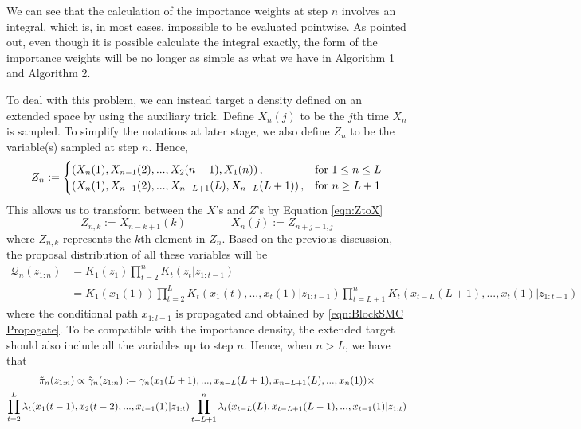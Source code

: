 \documentclass[12pt,a4paper]{article}
\begin{document}
We can see that the calculation of the importance weights at step $n$ involves an integral, which is, in most cases, impossible to be evaluated pointwise. As \cite{doucet2006efficient} pointed out, even though it is possible calculate the integral exactly, the form of the importance weights will be no longer as simple as what we have in Algorithm 1 and Algorithm 2. 

To deal with this problem, we can instead target a density defined on an extended space by using the auxiliary trick. Define $X_n(j)$ to be the $j$th time $X_n$ is sampled. To simplify the notations at later stage, we also define $Z_n$ to be the variable(s) sampled at step $n$. Hence,
\begin{equation*}
    Z_n := \begin{cases}
    \left(X_n(1),X_{n-1}(2),...,X_2(n-1),X_1(n)\right),& \textnormal{for}\ 1 \leq n \leq L \\
    \left(X_n(1),X_{n-1}(2),...,X_{n-L+1}(L),X_{n-L}(L+1)\right),& \textnormal{for}\ n \geq L+1
    \end{cases}
\end{equation*}
This allows us to transform between the $X$'s and $Z$'s by Equation \eqref{eqn:ZtoX}
\begin{equation}
    \label{eqn:ZtoX}
    Z_{n,k} := X_{n-k+1}(k) \quad\quad\quad\quad X_n(j):= Z_{n+j-1,j}
\end{equation}
where $Z_{n,k}$ represents the $k$th element in $Z_n$. Based on the previous discussion, the proposal distribution of all these variables will be 
\begin{equation*}
    \begin{split}
        \mathcal{Q}_n(z_{1:n}) &= K_1(z_1)\prod_{t=2}^n K_t(z_t|z_{1:t-1})\\
        &=K_1(x_1(1))\prod_{t=2}^L K_t(x_1(t),...,x_t(1)|z_{1:t-1})\prod_{t=L+1}^n K_t(x_{t-L}(L+1),...,x_t(1)|z_{1:t-1})
    \end{split}
\end{equation*}
where the conditional path $x_{1:l-1}$ is propagated and obtained by \eqref{eqn:BlockSMC Propogate}. To be compatible with the importance density, the extended target should also include all the variables up to step $n$. Hence, when \(n>L\), we have that 
\begin{multline}
    \label{eqn:BlockSMC_ExtendedTarget2}
    \Tilde{\pi}_n(z_{1:n}) \propto \Tilde{\gamma}_n(z_{1:n}) := \gamma_n(x_1(L+1),...,x_{n-L}(L+1),x_{n-L+1}(L),...,x_n(1))\times\\
    \prod_{t=2}^L \lambda_t(x_{1}(t-1),x_{2}(t-2),...,x_{t-1}(1)|z_{1:t})\prod_{t=L+1}^{n}\lambda_t(x_{t-L}(L),x_{t-L+1}(L-1),...,x_{t-1}(1)|z_{1:t})
\end{multline}
\end{document}
